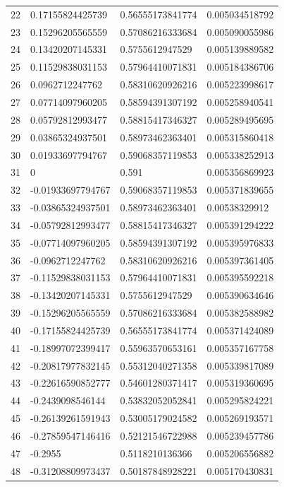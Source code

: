 \documentclass{amsart}
\numberwithin{equation}{section}
\numberwithin{table}{section}
\begin{document}
\begin{longtable}{@{}rlll@{}}
22 & 0.17155824425739 & 0.56555173841774 & 0.005034518792 \\
23 & 0.15296205565559 & 0.57086216333684 & 0.005090055986 \\
24 & 0.13420207145331 & 0.5755612947529 & 0.005139889582 \\
25 & 0.11529838031153 & 0.57964410071831 & 0.005184386706 \\
26 & 0.0962712247762 & 0.58310620926216 & 0.005223998617 \\
27 & 0.07714097960205 & 0.58594391307192 & 0.005258940541 \\
28 & 0.05792812993477 & 0.58815417346327 & 0.005289495695 \\
29 & 0.03865324937501 & 0.58973462363401 & 0.005315860418 \\
30 & 0.01933697794767 & 0.59068357119853 & 0.005338252913 \\
31 & 0 & 0.591 & 0.005356869923 \\
32 & -0.01933697794767 & 0.59068357119853 & 0.005371839655 \\
33 & -0.03865324937501 & 0.58973462363401 & 0.00538329912 \\
34 & -0.05792812993477 & 0.58815417346327 & 0.005391294222 \\
35 & -0.07714097960205 & 0.58594391307192 & 0.005395976833 \\
36 & -0.0962712247762 & 0.58310620926216 & 0.005397361405 \\
37 & -0.11529838031153 & 0.57964410071831 & 0.005395592218 \\
38 & -0.13420207145331 & 0.5755612947529 & 0.005390634646 \\
39 & -0.15296205565559 & 0.57086216333684 & 0.005382588982 \\
40 & -0.17155824425739 & 0.56555173841774 & 0.005371424089 \\
41 & -0.18997072399417 & 0.55963570653161 & 0.005357167758 \\
42 & -0.20817977832145 & 0.55312040271358 & 0.005339817089 \\
43 & -0.22616590852777 & 0.54601280371417 & 0.005319360695 \\
44 & -0.2439098546144 & 0.53832052052841 & 0.005295824221 \\
45 & -0.26139261591943 & 0.53005179024582 & 0.005269193571 \\
46 & -0.27859547146416 & 0.52121546722988 & 0.005239457786 \\
47 & -0.2955 & 0.5118210136366 & 0.005206556882 \\
48 & -0.31208809973437 & 0.50187848928221 & 0.005170430831 \\

\end{longtable}
\end{document}
